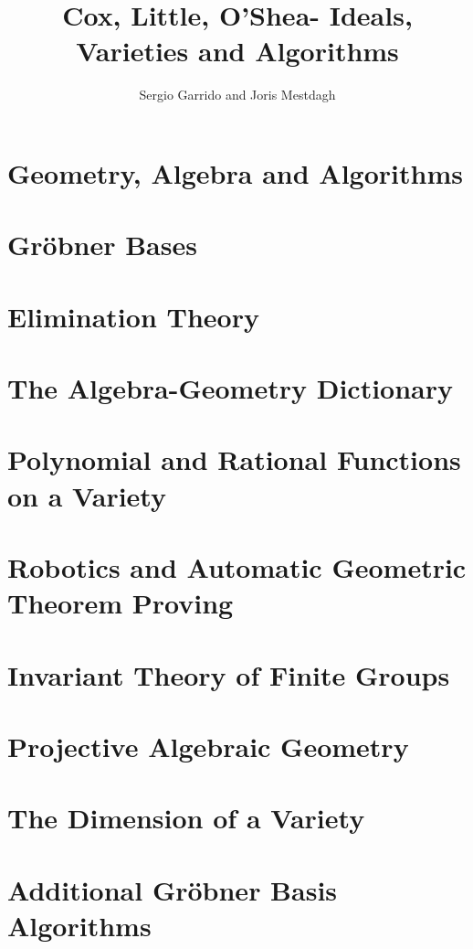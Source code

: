 \documentclass{bookSolutions}
\title{Cox, Little, O'Shea- Ideals, Varieties and Algorithms}
\author{Sergio Garrido and Joris Mestdagh}
\begin{document}
\tableofcontents
\newpage

\chapter{Geometry, Algebra and Algorithms}






\newpage
\chapter{Gr\"{o}bner Bases}





\newpage
\chapter{Elimination Theory}

\newpage
\chapter{The Algebra-Geometry Dictionary}

\newpage
\chapter{Polynomial and Rational Functions on a Variety}

\newpage
\chapter{Robotics and Automatic Geometric Theorem Proving}

\newpage
\chapter{Invariant Theory of Finite Groups}

\newpage
\chapter{Projective Algebraic Geometry}

\newpage
\chapter{The Dimension of a Variety}

\newpage
\chapter{Additional Gr\"{o}bner Basis Algorithms}
\end{document}
